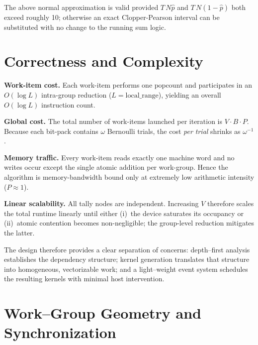 The above normal approximation is valid provided \(T\,N\widehat{p}\)
and \(T\,N(1-\widehat{p})\) both exceed roughly 10; otherwise an exact
Clopper-Pearson interval can be substituted with no change to the running
sum logic.

\section{Correctness and Complexity}

\textbf{Work-item cost.}
Each work-item performs one \(\mathrm{popcount}\) and
participates in an \(O(\log L)\) intra-group reduction
(\(L\!=\!\text{local\_range}\)), yielding an overall
\(O(\log L)\) instruction count.

\textbf{Global cost.}
The total number of work-items launched per iteration is
\(V\cdot B\cdot P\).  Because each bit-pack contains \(\omega\) Bernoulli
trials, the cost \emph{per trial} shrinks as \(\omega^{-1}\).

\textbf{Memory traffic.}
Every work-item reads exactly one machine word and no writes occur except
the single atomic addition per work-group.  Hence the algorithm is
memory-bandwidth bound only at extremely low arithmetic intensity
(\(P\approx 1\)).

\textbf{Linear scalability.}
All tally nodes are independent.  Increasing \(V\) therefore scales the total
runtime linearly until either (i)~the device saturates its occupancy or
(ii)~atomic contention becomes non-negligible; the group-level reduction
mitigates the latter.

The design therefore provides a clear separation of concerns: depth--first
analysis establishes the dependency structure; kernel generation translates
that structure into homogeneous, vectorizable work; and a light--weight event
system schedules the resulting kernels with minimal host intervention.


\section{Work--Group Geometry and Synchronization}
\label{subsec:tally_geometry}

